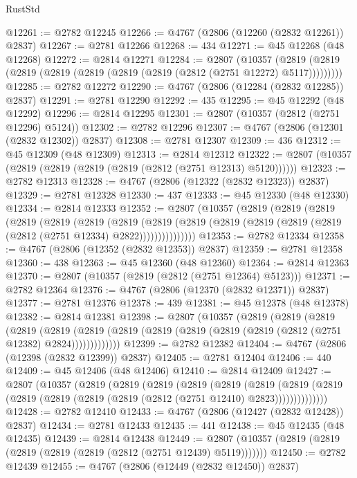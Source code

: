 \begin{lexlean}{RustStd}
\begin{coremodule}
@12261 := @2782 @12245
@12266 := @4767 (@2806 (@12260 (@2832 @12261)) @2837)
@12267 := @2781 @12266
@12268 := 434
@12271 := @45 @12268 (@48 @12268)
@12272 := @2814 @12271
@12284 := @2807
    (@10357 (@2819 (@2819 (@2819 (@2819 (@2819 (@2819 (@2819 (@2812 (@2751 @12272) @5117)))))))))
@12285 := @2782 @12272
@12290 := @4767 (@2806 (@12284 (@2832 @12285)) @2837)
@12291 := @2781 @12290
@12292 := 435
@12295 := @45 @12292 (@48 @12292)
@12296 := @2814 @12295
@12301 := @2807 (@10357 (@2812 (@2751 @12296) @5124))
@12302 := @2782 @12296
@12307 := @4767 (@2806 (@12301 (@2832 @12302)) @2837)
@12308 := @2781 @12307
@12309 := 436
@12312 := @45 @12309 (@48 @12309)
@12313 := @2814 @12312
@12322 := @2807 (@10357 (@2819 (@2819 (@2819 (@2819 (@2812 (@2751 @12313) @5120))))))
@12323 := @2782 @12313
@12328 := @4767 (@2806 (@12322 (@2832 @12323)) @2837)
@12329 := @2781 @12328
@12330 := 437
@12333 := @45 @12330 (@48 @12330)
@12334 := @2814 @12333
@12352 := @2807
    (@10357
      (@2819
        (@2819
          (@2819
            (@2819
              (@2819
                (@2819
                  (@2819
                    (@2819
                      (@2819 (@2819 (@2819 (@2819 (@2819 (@2812 (@2751 @12334) @2822)))))))))))))))
@12353 := @2782 @12334
@12358 := @4767 (@2806 (@12352 (@2832 @12353)) @2837)
@12359 := @2781 @12358
@12360 := 438
@12363 := @45 @12360 (@48 @12360)
@12364 := @2814 @12363
@12370 := @2807 (@10357 (@2819 (@2812 (@2751 @12364) @5123)))
@12371 := @2782 @12364
@12376 := @4767 (@2806 (@12370 (@2832 @12371)) @2837)
@12377 := @2781 @12376
@12378 := 439
@12381 := @45 @12378 (@48 @12378)
@12382 := @2814 @12381
@12398 := @2807
    (@10357
      (@2819
        (@2819
          (@2819
            (@2819
              (@2819
                (@2819 (@2819 (@2819 (@2819 (@2819 (@2819 (@2812 (@2751 @12382) @2824)))))))))))))
@12399 := @2782 @12382
@12404 := @4767 (@2806 (@12398 (@2832 @12399)) @2837)
@12405 := @2781 @12404
@12406 := 440
@12409 := @45 @12406 (@48 @12406)
@12410 := @2814 @12409
@12427 := @2807
    (@10357
      (@2819
        (@2819
          (@2819
            (@2819
              (@2819
                (@2819
                  (@2819
                    (@2819 (@2819 (@2819 (@2819 (@2819 (@2812 (@2751 @12410) @2823))))))))))))))
@12428 := @2782 @12410
@12433 := @4767 (@2806 (@12427 (@2832 @12428)) @2837)
@12434 := @2781 @12433
@12435 := 441
@12438 := @45 @12435 (@48 @12435)
@12439 := @2814 @12438
@12449 := @2807 (@10357 (@2819 (@2819 (@2819 (@2819 (@2819 (@2812 (@2751 @12439) @5119)))))))
@12450 := @2782 @12439
@12455 := @4767 (@2806 (@12449 (@2832 @12450)) @2837)

\end{coremodule}
\end{lexlean}
